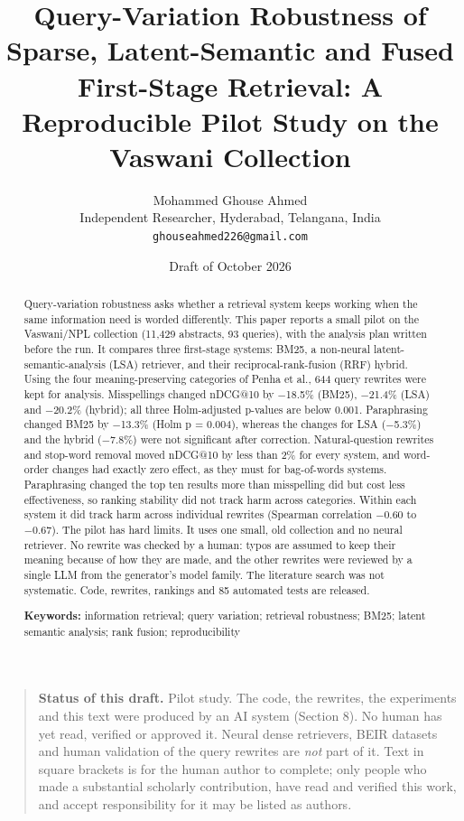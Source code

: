 \documentclass[
  11pt,
]{article}
\title{Query-Variation Robustness of Sparse, Latent-Semantic and Fused
First-Stage Retrieval: A Reproducible Pilot Study on the Vaswani
Collection}
\author{Mohammed Ghouse Ahmed\\
\small Independent Researcher, Hyderabad, Telangana, India\\
\small \texttt{ghouseahmed226@gmail.com}}
\date{Draft of October 2026}
\begin{document}
\maketitle
\begin{abstract}
Query-variation robustness asks whether a retrieval system keeps working
when the same information need is worded differently. This paper reports
a small pilot on the Vaswani/NPL collection (11,429 abstracts, 93
queries), with the analysis plan written before the run. It compares
three first-stage systems: BM25, a non-neural latent-semantic-analysis
(LSA) retriever, and their reciprocal-rank-fusion (RRF) hybrid. Using
the four meaning-preserving categories of Penha et al., 644 query
rewrites were kept for analysis. Misspellings changed nDCG@10 by −18.5\%
(BM25), −21.4\% (LSA) and −20.2\% (hybrid); all three Holm-adjusted
p-values are below 0.001. Paraphrasing changed BM25 by −13.3\% (Holm p =
0.004), whereas the changes for LSA (−5.3\%) and the hybrid (−7.8\%)
were not significant after correction. Natural-question rewrites and
stop-word removal moved nDCG@10 by less than 2\% for every system, and
word-order changes had exactly zero effect, as they must for
bag-of-words systems. Paraphrasing changed the top ten results more than
misspelling did but cost less effectiveness, so ranking stability did
not track harm across categories. Within each system it did track harm
across individual rewrites (Spearman correlation −0.60 to −0.67). The
pilot has hard limits. It uses one small, old collection and no neural
retriever. No rewrite was checked by a human: typos are assumed to keep
their meaning because of how they are made, and the other rewrites were
reviewed by a single LLM from the generator's model family. The
literature search was not systematic. Code, rewrites, rankings and 85
automated tests are released.

\textbf{Keywords:} information retrieval; query variation; retrieval
robustness; BM25; latent semantic analysis; rank fusion; reproducibility
\end{abstract}

\begin{quote}
\textbf{Status of this draft.} Pilot study. The code, the rewrites, the
experiments and this text were produced by an AI system (Section 8). No
human has yet read, verified or approved it. Neural dense retrievers,
BEIR datasets and human validation of the query rewrites are \emph{not}
part of it. Text in square brackets is for the human author to complete;
only people who made a substantial scholarly contribution, have read and
verified this work, and accept responsibility for it may be listed as
authors.
\end{quote}
\end{document}
